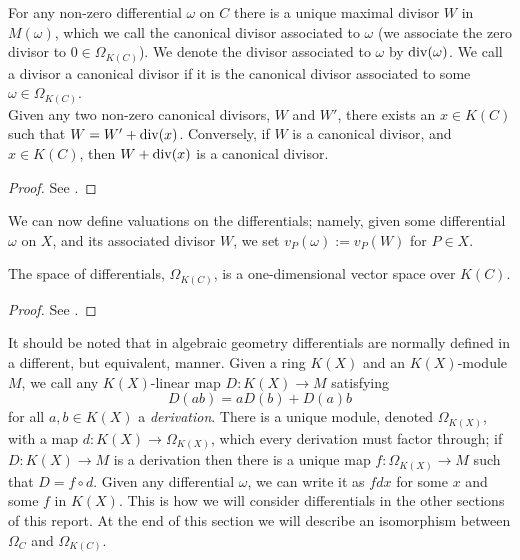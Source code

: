 \begin{defnlem}
 For any non-zero differential $\omega$ on $C$ there is a unique maximal divisor $W$ in $M(\omega)$, which we call the {\rm canonical divisor associated to $\omega$} (we associate the zero divisor to $0\in \Omega_{K(C)}$).
 We denote the divisor associated to $\omega$ by $\operatorname{div} (\omega)$.
 We call a divisor a {\rm canonical divisor} if it is the canonical divisor associated to some $\omega \in \Omega_{K(C)}$.\\
 Given any two non-zero canonical divisors, $W$ and $W'$, there exists an $x\in K(C)$ such that $W = W' + \operatorname{div}(x)$.
 Conversely, if $W$ is a canonical divisor, and $x\in K(C)$, then $W + \operatorname{div}(x)$ is a canonical divisor.
\end{defnlem}
\begin{proof}
 See \cite[Lem. I.5.10 and Prop. I.5.13]{stichtenoth}.
\end{proof}

We can now define valuations on the differentials; namely, given some differential $\omega $ on $X$, and its associated divisor $W$, we set $v_P(\omega):=v_P(W)$ for $P\in X$.




\begin{prop}
 The space of differentials, $\Omega_{K(C)}$, is a one-dimensional vector space over $K(C)$.
\end{prop}
\begin{proof}
 See \cite[Prop. I.5.9]{stichtenoth}.
\end{proof}



It should be noted that in algebraic geometry differentials are normally defined in a different, but equivalent, manner.
Given a ring $K(X)$ and an $K(X)$-module $M$, we call any $K(X)$-linear map $D\colon K(X)\rightarrow M$ satisfying \[D(ab) = aD(b) + D(a)b\] for all $a,b\in K(X)$ a {\em derivation}.
There is a unique module, denoted $\Omega_{K(X)}$, with a map $d\colon K(X) \rightarrow \Omega_{K(X)}$, which every derivation must factor through; \ie if $D\colon K(X)\rightarrow M$ is a derivation then there is a unique map $f\colon \Omega_{K(X)}\rightarrow M$ such that $D = f\circ d$.
Given any differential $\omega$, we can write it as $fdx$ for some $x$ and some $f$ in $K(X)$.
This is how we will consider differentials in the other sections of this report.
At the end of this section we will describe an isomorphism between $\Omega_C$ and $\Omega_{K(C)}$.


